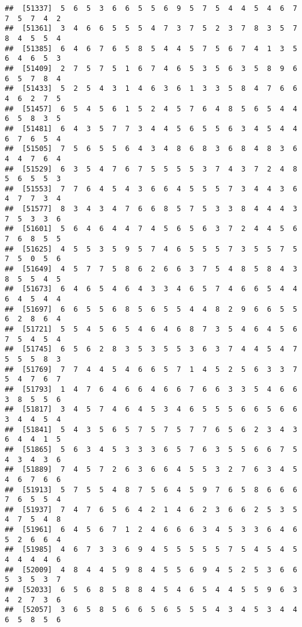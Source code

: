 \documentclass[
]{book}
\begin{document}
\begin{verbatim}
##  [51337]  5  6  5  3  6  6  5  5  6  9  5  7  5  4  4  5  4  6  7  7  5  7  4  2
##  [51361]  3  4  6  6  5  5  5  4  7  3  7  5  2  3  7  8  3  5  7  8  4  5  5  4
##  [51385]  6  4  6  7  6  5  8  5  4  4  5  7  5  6  7  4  1  3  5  6  4  6  5  3
##  [51409]  2  7  5  7  5  1  6  7  4  6  5  3  5  6  3  5  8  9  6  6  5  7  8  4
##  [51433]  5  2  5  4  3  1  4  6  3  6  1  3  3  5  8  4  7  6  6  4  6  2  7  5
##  [51457]  6  5  4  5  6  1  5  2  4  5  7  6  4  8  5  6  5  4  4  6  5  8  3  5
##  [51481]  6  4  3  5  7  7  3  4  4  5  6  5  5  6  3  4  5  4  4  6  7  6  5  4
##  [51505]  7  5  6  5  5  6  4  3  4  8  6  8  3  6  8  4  8  3  6  4  4  7  6  4
##  [51529]  6  3  5  4  7  6  7  5  5  5  5  3  7  4  3  7  2  4  8  5  6  5  5  3
##  [51553]  7  7  6  4  5  4  3  6  6  4  5  5  5  7  3  4  4  3  6  4  7  7  3  4
##  [51577]  8  3  4  3  4  7  6  6  8  5  7  5  3  3  8  4  4  4  3  7  5  3  3  6
##  [51601]  5  6  4  6  4  4  7  4  5  6  5  6  3  7  2  4  4  5  6  7  6  8  5  5
##  [51625]  4  5  5  3  5  9  5  7  4  6  5  5  5  7  3  5  5  7  5  7  5  0  5  6
##  [51649]  4  5  7  7  5  8  6  2  6  6  3  7  5  4  8  5  8  4  3  8  5  5  4  5
##  [51673]  6  4  6  5  4  6  4  3  3  4  6  5  7  4  6  6  5  4  4  6  4  5  4  4
##  [51697]  6  6  5  5  6  8  5  6  5  5  4  4  8  2  9  6  6  5  5  6  2  8  6  4
##  [51721]  5  5  4  5  6  5  4  6  4  6  8  7  3  5  4  6  4  5  6  7  5  4  5  4
##  [51745]  6  5  6  2  8  3  5  3  5  5  3  6  3  7  4  4  5  4  7  5  5  5  8  3
##  [51769]  7  7  4  4  5  4  6  6  5  7  1  4  5  2  5  6  3  3  7  5  4  7  6  7
##  [51793]  1  4  7  6  4  6  6  4  6  6  7  6  6  3  3  5  4  6  6  3  8  5  5  6
##  [51817]  3  4  5  7  4  6  4  5  3  4  6  5  5  5  6  6  5  6  6  3  4  4  5  4
##  [51841]  5  4  3  5  6  5  7  5  7  5  7  7  6  5  6  2  3  4  3  6  4  4  1  5
##  [51865]  5  6  3  4  5  3  3  3  6  5  7  6  3  5  5  6  6  7  5  4  3  4  3  6
##  [51889]  7  4  5  7  2  6  3  6  6  4  5  5  3  2  7  6  3  4  5  4  6  7  6  6
##  [51913]  5  7  5  5  4  8  7  5  6  4  5  9  7  6  5  8  6  6  6  7  6  5  5  4
##  [51937]  7  4  7  6  5  6  4  2  1  4  6  2  3  6  6  2  5  3  5  4  7  5  4  8
##  [51961]  6  4  5  6  7  1  2  4  6  6  6  3  4  5  3  3  6  4  6  5  2  6  6  4
##  [51985]  4  6  7  3  3  6  9  4  5  5  5  5  5  7  5  4  5  4  5  4  4  4  4  6
##  [52009]  4  8  4  4  5  9  8  4  5  5  6  9  4  5  2  5  3  6  6  5  3  5  3  7
##  [52033]  6  5  6  8  5  8  8  4  5  4  6  5  4  4  5  5  9  6  3  4  2  7  3  6
##  [52057]  3  6  5  8  5  6  6  5  6  5  5  5  4  3  4  5  3  4  4  6  5  8  5  6

\end{verbatim}
\end{document}
